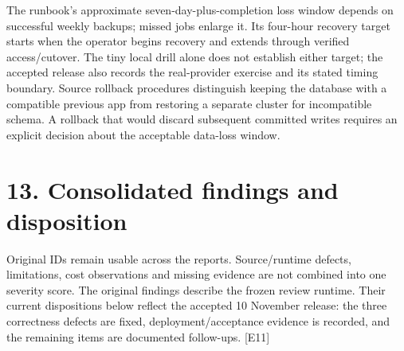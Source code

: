 \documentclass[11pt,a4paper]{article}
\begin{document}
The runbook's approximate seven-day-plus-completion loss window depends on successful weekly backups; missed jobs enlarge it. Its four-hour recovery target starts when the operator begins recovery and extends through verified access/\allowbreak{}cutover. The tiny local drill alone does not establish either target; the accepted release also records the real-provider exercise and its stated timing boundary. Source rollback procedures distinguish keeping the database with a compatible previous app from restoring a separate cluster for incompatible schema. A rollback that would discard subsequent committed writes requires an explicit decision about the acceptable data-loss window.

\clearpage
\section*{13. Consolidated findings and disposition}

Original IDs remain usable across the reports. Source/\allowbreak{}runtime defects, limitations, cost observations and missing evidence are not combined into one severity score. The original findings describe the frozen review runtime. Their current dispositions below reflect the accepted 10 November release: the three correctness defects are fixed, deployment/\allowbreak{}acceptance evidence is recorded, and the remaining items are documented follow-ups. [E11]
\end{document}

